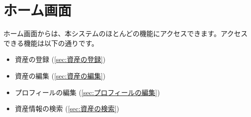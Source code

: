 \documentclass[11ptm]{jsarticle}
\begin{document}
\clearpage
\section{ホーム画面}
\label{sec:ホーム画面}
ホーム画面からは、本システムのほとんどの機能にアクセスできます。アクセスできる機能は以下の通りです。
\begin{itemize}
  \item 資産の登録 (\!\ref{sec:資産の登録})
  \item 資産の編集 (\!\ref{sec:資産の編集})
  \item プロフィールの編集 (\!\ref{sec:プロフィールの編集})
  \item 資産情報の検索 (\!\ref{sec:資産の検索})
\end{itemize}
\end{document}
